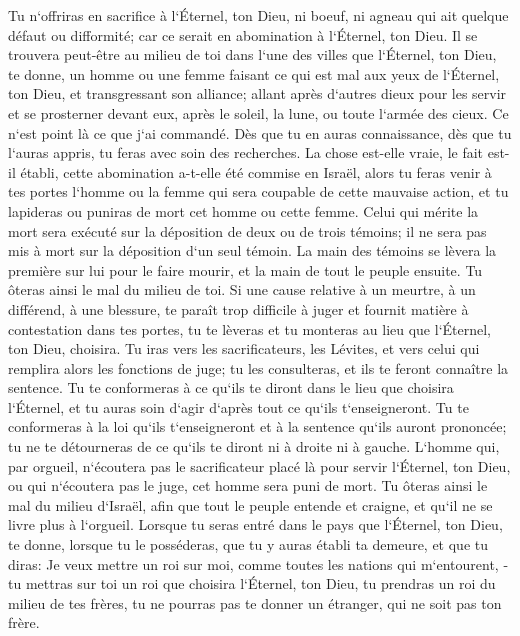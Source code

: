 \verse Tu n`offriras en sacrifice à l`Éternel, ton Dieu, ni boeuf, ni agneau qui ait quelque défaut ou difformité; car ce serait en abomination à l`Éternel, ton Dieu. 
\verse Il se trouvera peut-être au milieu de toi dans l`une des villes que l`Éternel, ton Dieu, te donne, un homme ou une femme faisant ce qui est mal aux yeux de l`Éternel, ton Dieu, et transgressant son alliance; 
\verse allant après d`autres dieux pour les servir et se prosterner devant eux, après le soleil, la lune, ou toute l`armée des cieux. Ce n`est point là ce que j`ai commandé. 
\verse Dès que tu en auras connaissance, dès que tu l`auras appris, tu feras avec soin des recherches. La chose est-elle vraie, le fait est-il établi, cette abomination a-t-elle été commise en Israël, 
\verse alors tu feras venir à tes portes l`homme ou la femme qui sera coupable de cette mauvaise action, et tu lapideras ou puniras de mort cet homme ou cette femme. 
\verse Celui qui mérite la mort sera exécuté sur la déposition de deux ou de trois témoins; il ne sera pas mis à mort sur la déposition d`un seul témoin. 
\verse La main des témoins se lèvera la première sur lui pour le faire mourir, et la main de tout le peuple ensuite. Tu ôteras ainsi le mal du milieu de toi. 
\verse Si une cause relative à un meurtre, à un différend, à une blessure, te paraît trop difficile à juger et fournit matière à contestation dans tes portes, tu te lèveras et tu monteras au lieu que l`Éternel, ton Dieu, choisira. 
\verse Tu iras vers les sacrificateurs, les Lévites, et vers celui qui remplira alors les fonctions de juge; tu les consulteras, et ils te feront connaître la sentence. 
\verse Tu te conformeras à ce qu`ils te diront dans le lieu que choisira l`Éternel, et tu auras soin d`agir d`après tout ce qu`ils t`enseigneront. 
\verse Tu te conformeras à la loi qu`ils t`enseigneront et à la sentence qu`ils auront prononcée; tu ne te détourneras de ce qu`ils te diront ni à droite ni à gauche. 
\verse L`homme qui, par orgueil, n`écoutera pas le sacrificateur placé là pour servir l`Éternel, ton Dieu, ou qui n`écoutera pas le juge, cet homme sera puni de mort. Tu ôteras ainsi le mal du milieu d`Israël, 
\verse afin que tout le peuple entende et craigne, et qu`il ne se livre plus à l`orgueil. 
\verse Lorsque tu seras entré dans le pays que l`Éternel, ton Dieu, te donne, lorsque tu le posséderas, que tu y auras établi ta demeure, et que tu diras: Je veux mettre un roi sur moi, comme toutes les nations qui m`entourent, - 
\verse tu mettras sur toi un roi que choisira l`Éternel, ton Dieu, tu prendras un roi du milieu de tes frères, tu ne pourras pas te donner un étranger, qui ne soit pas ton frère. 
